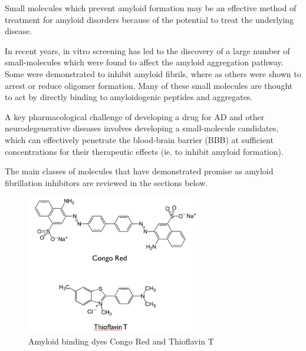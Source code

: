 

Small molecules which prevent amyloid formation may be an effective method of treatment for amyloid disorders because of the potential to treat the underlying disease. 

In recent years, in vitro screening has led to the discovery of a large number of small-molecules which were found to affect the amyloid aggregation pathway. Some were demonstrated to inhibit amyloid fibrils, where as others were shown to arrest or reduce oligomer formation. Many of these small molecules are thought to act by directly binding to amyloidogenic peptides and aggregates.

A key pharmacological challenge of developing a drug for AD and other neurodegenerative diseases involves developing a small-molecule candidates, which can effectively penetrate the blood-brain barrier (BBB) at sufficient concentrations for their therapeutic effects (ie. to inhibit amyloid formation).

The main classes of molecules that have demonstrated promise as amyloid fibrillation inhibitors are reviewed in the sections below.


\begin{figure}
\centering
\includegraphics[width=3in]{figures/introduction/dyes.png}
\caption[Small molecule binders]{Amyloid binding dyes Congo Red and Thioflavin T}
\label{fig:amyloid_dyes}
\end{figure}

